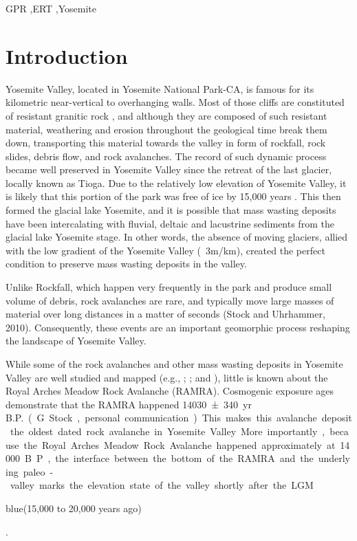 \documentclass[5p]{elsarticle}
\newcommand{\COMON}{\begin{color}{blue}}
\newcommand{\COMOFF}{\end{color}}
\begin{document}
\begin{frontmatter}
\begin{abstract}
									\end{abstract}

					\begin{keyword}
GPR \sep ERT \sep Yosemite
					\end{keyword}

	\end{frontmatter}


\section{Introduction}

Yosemite Valley, located in Yosemite National Park-CA, is famous for its kilometric near-vertical to overhanging walls. Most of those cliffs are constituted of resistant granitic rock \citep{bateman1992plutonism}, and although they are composed of such resistant material, weathering and erosion throughout the geological time break them down, transporting this material towards the valley in form of rockfall, rock slides, debris flow, and rock avalanches. The record of such dynamic process became well preserved in Yosemite Valley since the retreat of the last glacier, locally known as Tioga. Due to the relatively low elevation of Yosemite Valley, it is likely that this portion of the park was free of ice by 15,000 years \citep{Wieczorek+1996}. This then formed the glacial lake Yosemite, and it is possible that mass wasting deposits have been intercalating with fluvial, deltaic and lacustrine sediments from the glacial lake Yosemite stage.   In other words, the absence of moving glaciers, allied with the low gradient of the Yosemite Valley (~3m/km), created the perfect condition to preserve mass wasting deposits in the valley. 

Unlike Rockfall, which happen very frequently in the park and produce small volume of debris, rock avalanches are rare, and typically move large masses of material over long distances in a matter of seconds (Stock and Uhrhammer, 2010). Consequently, these events are an important geomorphic process reshaping the landscape of Yosemite Valley. 

While some of the rock avalanches and other mass wasting deposits in Yosemite Valley are well studied and mapped (e.g., \cite{stock2014quantitative};  \cite{stock2010catastrophic}; and \cite{wieczorek1998rockfall}), little is known about the Royal Arches Meadow Rock Avalanche (RAMRA). Cosmogenic  exposure ages demonstrate that the RAMRA happened \SI{14030 \pm 340}{yr\, B.P.} (G. Stock, personal communication). This makes this avalanche deposit the oldest dated rock avalanche in Yosemite Valley. More importantly, because the Royal Arches Meadow Rock Avalanche happened approximately at 14000 B.P., the interface between the bottom of the RAMRA and the underlying paleo-valley marks the elevation state of the valley shortly after the LGM \COMON(15,000 to 20,000 years ago)\COMOFF. 
\end{document}
